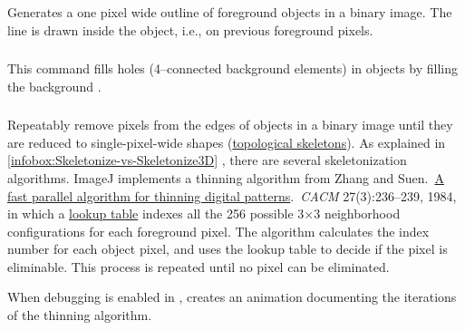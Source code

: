 \subsubsection{\protect{}\label{sub:Outline}}

Generates a one pixel wide outline of foreground objects
in a binary image. The line is drawn inside the object, i.e., on previous
foreground pixels.


\subsubsection{\protect{}\label{sub:Fill-Holes}}

This command fills holes (4--connected background elements)
in objects by filling the background \cite{C-Fill-Holes}.


\subsubsection[\protect\userinterface{Skeletonize}]{\protect{}\label{sub:Skeletonize}\improvement{}}

Repeatably remove pixels from the edges of objects in a binary image
until they are reduced to single-pixel-wide shapes 
(\href{http://en.wikipedia.org/wiki/Topological_skeleton}{topological skeletons}).
As explained in \ref{infobox:Skeletonize-vs-Skeletonize3D} ,
there are several skeletonization algorithms. ImageJ implements a
thinning algorithm from Zhang and Suen.\ \href{http://dx.doi.org/10.1145/357994.358023}{A fast parallel algorithm for thinning digital patterns}.\ \emph{CACM}
27(3):236--239, 1984, in which a \href{http://imagej.nih.gov/ij/images/skeletonize-table.gif}{lookup table}
indexes all the 256 possible 3$\times$3 neighborhood configurations
for each foreground pixel. The algorithm calculates the index number
for each object pixel, and uses the lookup table to decide if the
pixel is eliminable. This process is repeated until no pixel can be
eliminated.

When debugging is enabled in ,
 creates an animation documenting the
iterations of the thinning algorithm.



